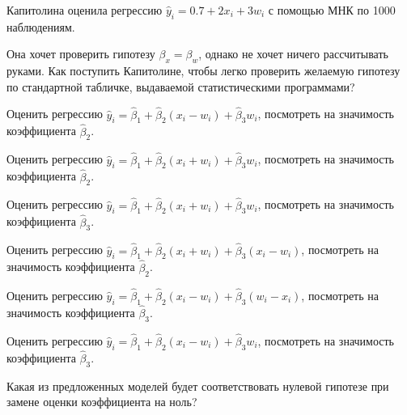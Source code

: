
\begin{question}
Капитолина оценила регрессию \(\hat y_i = 0.7 + 2x_i + 3w_i\) с помощью МНК по 1000 наблюдениям.

Она хочет проверить гипотезу \(\beta_x = \beta_w\), однако не хочет ничего рассчитывать руками.
Как поступить Капитолине, чтобы легко проверить желаемую гипотезу по стандартной табличке,
выдаваемой статистическими программами?
\begin{answerlist}
  \item Оценить регрессию \(\hat y_i = \hat \beta_1 + \hat\beta_2 (x_i - w_i) + \hat\beta_3 w_i\), посмотреть на значимость коэффициента \(\hat\beta_2\).
  \item Оценить регрессию \(\hat y_i = \hat \beta_1 + \hat\beta_2 (x_i + w_i) + \hat\beta_3 w_i\), посмотреть на значимость коэффициента \(\hat\beta_2\).
  \item Оценить регрессию \(\hat y_i = \hat \beta_1 + \hat\beta_2 (x_i + w_i) + \hat\beta_3 w_i\), посмотреть на значимость коэффициента \(\hat\beta_3\).
  \item Оценить регрессию \(\hat y_i = \hat \beta_1 + \hat\beta_2 (x_i + w_i) + \hat\beta_3 (x_i - w_i)\), посмотреть на значимость коэффициента \(\hat\beta_2\).
  \item Оценить регрессию \(\hat y_i = \hat \beta_1 + \hat\beta_2 (x_i - w_i) + \hat\beta_3 (w_i - x_i)\), посмотреть на значимость коэффициента \(\hat\beta_3\).
  \item Оценить регрессию \(\hat y_i = \hat \beta_1 + \hat\beta_2 (x_i - w_i) + \hat\beta_3 w_i\), посмотреть на значимость коэффициента \(\hat\beta_3\).
\end{answerlist}
\end{question}

\begin{solution}
Какая из предложенных моделей будет соответствовать нулевой гипотезе при замене оценки коэффициента на ноль?
\end{solution}

